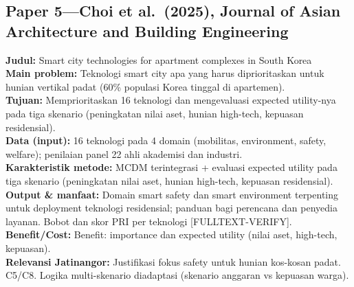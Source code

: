 \documentclass[a4paper,11pt]{article}
\begin{document}
\subsection*{Paper 5---Choi et al.\ (2025), Journal of Asian Architecture and Building Engineering}
\textbf{Judul:} Smart city technologies for apartment complexes in South Korea\\
\textbf{Main problem:} Teknologi smart city apa yang harus diprioritaskan untuk hunian vertikal padat (60\% populasi Korea tinggal di apartemen).\\
\textbf{Tujuan:} Memprioritaskan 16 teknologi dan mengevaluasi expected utility-nya pada tiga skenario (peningkatan nilai aset, hunian high-tech, kepuasan residensial).\\
\textbf{Data (input):} 16 teknologi pada 4 domain (mobilitas, environment, safety, welfare); penilaian panel 22 ahli akademisi dan industri.\\
\textbf{Karakteristik metode:} MCDM terintegrasi + evaluasi expected utility pada tiga skenario (peningkatan nilai aset, hunian high-tech, kepuasan residensial).\\
\textbf{Output \& manfaat:} Domain smart safety dan smart environment terpenting untuk deployment teknologi residensial; panduan bagi perencana dan penyedia layanan. Bobot dan skor PRI per teknologi [FULLTEXT-VERIFY].\\
\textbf{Benefit/Cost:} Benefit: importance dan expected utility (nilai aset, high-tech, kepuasan).\\
\textbf{Relevansi Jatinangor:} Justifikasi fokus safety untuk hunian kos-kosan padat. C5/C8. Logika multi-skenario diadaptasi (skenario anggaran vs kepuasan warga).
\end{document}
